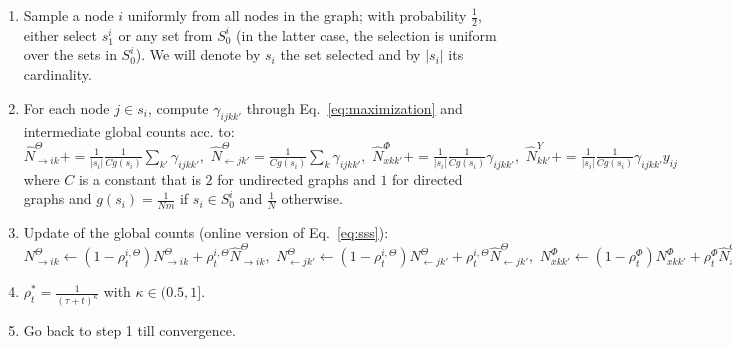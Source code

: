 \begin{enumerate}
\item Sample a node $i$ uniformly from all nodes in the graph; with probability $\frac{1}{2}$, either select $s_1^i$ or any set from $S_0^i$ (in the latter case, the selection is uniform over the sets in $S_0^i$). We will denote by $s_i$ the set selected and by $|s_i|$ its cardinality.
\item For each node $j \in s_i$, compute $\gamma_{ijkk'}$ through Eq.~\ref{eq:maximization} and intermediate global counts acc. to: {\small
$\hat N^{\Theta}_{\rightarrow ik} += \frac{1}{|s_i|} \frac{1}{Cg(s_i)} \sum_{k'} \gamma_{ijkk'}, \,\, \hat N^{\Theta}_{\leftarrow jk'} = \frac{1}{Cg(s_i)} \sum_{k} \gamma_{ijkk'}, \,\, \hat N^{\Phi}_{xkk'} += \frac{1}{|s_i|} \frac{1}{Cg(s_i)} \gamma_{ijkk'}, \,\, \hat N^{Y}_{kk'} += \frac{1}{|s_i|} \frac{1}{Cg(s_i)} \gamma_{ijkk'} y_{ij}$
}\\
where $C$ is a constant that is $2$ for undirected graphs and $1$ for directed graphs and $g(s_i) = \frac{1}{Nm}$ if $s_i \in S_0^i$ and $\frac{1}{N}$ otherwise.
\item Update of the global counts (online version of Eq.~\ref{eq:sss}): {\small $N^{\Theta}_{\rightarrow ik} \leftarrow (1 - \rho^{i,\Theta}_t) N^{\Theta}_{\rightarrow ik} + \rho^{i,\Theta}_t \hat N^{\Theta}_{\rightarrow ik}, \,\, N^{\Theta}_{\leftarrow jk'} \leftarrow (1 - \rho^{i,\Theta}_t) N^{\Theta}_{\leftarrow jk'} + \rho^{i,\Theta}_t \hat N^{\Theta}_{\leftarrow jk'}, \,\, N^{\Phi}_{xkk'} \leftarrow (1 - \rho^{\Phi}_t) N^{\Phi}_{xkk'} + \rho^{\Phi}_t \hat N^{\Phi}_{xkk'}, \,\, N^{Y}_{kk'} \leftarrow (1 - \rho^{Y}_t) + \rho^{Y}_t \hat N^{Y}_{kk'}$}
\item $\rho^*_t = \frac{1}{(\tau +t)^\kappa}$ with $\kappa \in (0.5, 1]$.
\item Go back to step 1 till convergence.
\end{enumerate}
